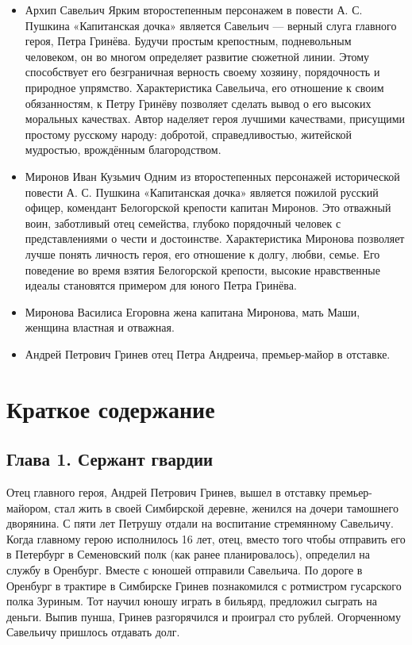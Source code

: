 \documentclass[a4paper,12pt]{article}
\begin{document}
\begin{itemize}
\item Архип Савельич
Ярким второстепенным персонажем в повести А. С. Пушкина «Капитанская дочка» является Савельич — верный слуга главного героя, Петра Гринёва. Будучи простым крепостным, подневольным человеком, он во многом определяет развитие сюжетной линии. Этому способствует его безграничная верность своему хозяину, порядочность и природное упрямство. Характеристика Савельича, его отношение к своим обязанностям, к Петру Гринёву позволяет сделать вывод о его высоких моральных качествах. Автор наделяет героя лучшими качествами, присущими простому русскому народу: добротой, справедливостью, житейской мудростью, врождённым благородством.
\item Миронов Иван Кузьмич
Одним из второстепенных персонажей исторической повести А. С. Пушкина «Капитанская дочка» является пожилой русский офицер, комендант Белогорской крепости капитан Миронов. Это отважный воин, заботливый отец семейства, глубоко порядочный человек с представлениями о чести и достоинстве. Характеристика Миронова позволяет лучше понять личность героя, его отношение к долгу, любви, семье. Его поведение во время взятия Белогорской крепости, высокие нравственные идеалы становятся примером для юного Петра Гринёва.
\item Миронова Василиса Егоровна 
жена капитана Миронова, мать Маши, женщина властная и отважная.
\item Андрей Петрович Гринев 
отец Петра Андреича, премьер-майор в отставке.
\end{itemize}



\section{Краткое содержание}

\subsection{Глава 1. Сержант гвардии}

Отец главного героя, Андрей Петрович Гринев, вышел в отставку премьер-майором, стал жить в своей Симбирской деревне, женился на дочери тамошнего дворянина. С пяти лет Петрушу отдали на воспитание стремянному Савельичу. Когда главному герою исполнилось 16 лет, отец, вместо того чтобы отправить его в Петербург в Семеновский полк (как ранее планировалось), определил на службу в Оренбург. Вместе с юношей отправили Савельича.
По дороге в Оренбург в трактире в Симбирске Гринев познакомился с ротмистром гусарского полка Зуриным. Тот научил юношу играть в бильярд, предложил сыграть на деньги. Выпив пунша, Гринев разгорячился и проиграл сто рублей. Огорченному Савельичу пришлось отдавать долг.
\end{document}

